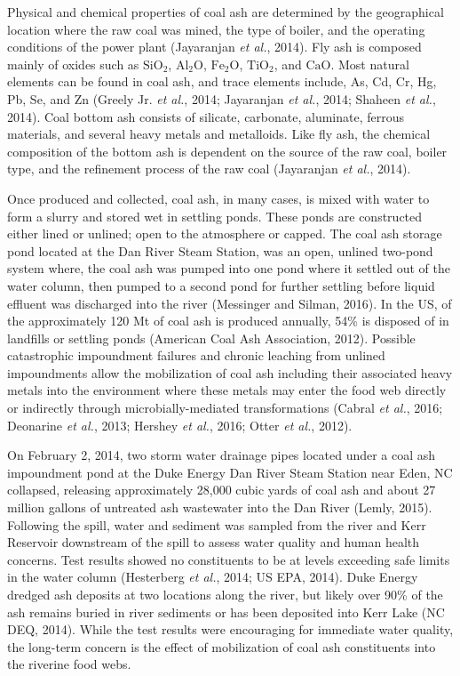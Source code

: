 \documentclass[ms, hidelinks]{uncgdissertationexp3}
\theoremstyle{plain}
\theoremstyle{definition}
\theoremstyle{remark}
\begin{document}
Physical and chemical properties of coal ash are determined by the geographical location where the raw coal was mined, the type of boiler, and the operating conditions of the power plant (Jayaranjan \emph{et al.}, 2014). Fly ash is composed mainly of oxides such as \(\mathrm{SiO_2}\), \(\mathrm{Al_2O}\), \(\mathrm{Fe_2O}\), \(\mathrm{TiO_2}\), and \(\mathrm{CaO}\). Most natural elements can be found in coal ash, and trace elements include, As, Cd, Cr, Hg, Pb, Se, and Zn (Greely Jr. \emph{et al.}, 2014; Jayaranjan \emph{et al.}, 2014; Shaheen \emph{et al.}, 2014). Coal bottom ash consists of silicate, carbonate, aluminate, ferrous materials, and several heavy metals and metalloids. Like fly ash, the chemical composition of the bottom ash is dependent on the source of the raw coal, boiler type, and the refinement process of the raw coal (Jayaranjan \emph{et al.}, 2014).

Once produced and collected, coal ash, in many cases, is mixed with water to form a slurry and stored wet in settling ponds. These ponds are constructed either lined or unlined; open to the atmosphere or capped. The coal ash storage pond located at the Dan River Steam Station, was an open, unlined two-pond system where, the coal ash was pumped into one pond where it settled out of the water column, then pumped to a second pond for further settling before liquid effluent was discharged into the river (Messinger and Silman, 2016). In the US, of the approximately 120 Mt of coal ash is produced annually, 54\% is disposed of in landfills or settling ponds (American Coal Ash Association, 2012). Possible catastrophic impoundment failures and chronic leaching from unlined impoundments allow the mobilization of coal ash including their associated heavy metals into the environment where these metals may enter the food web directly or indirectly through microbially-mediated transformations (Cabral \emph{et al.}, 2016; Deonarine \emph{et al.}, 2013; Hershey \emph{et al.}, 2016; Otter \emph{et al.}, 2012).

On February 2, 2014, two storm water drainage pipes located under a coal ash impoundment pond at the Duke Energy Dan River Steam Station near Eden, NC collapsed, releasing approximately 28,000 cubic yards of coal ash and about 27 million gallons of untreated ash wastewater into the Dan River (Lemly, 2015). Following the spill, water and sediment was sampled from the river and Kerr Reservoir downstream of the spill to assess water quality and human health concerns. Test results showed no constituents to be at levels exceeding safe limits in the water column (Hesterberg \emph{et al.}, 2014; US EPA, 2014). Duke Energy dredged ash deposits at two locations along the river, but likely over 90\% of the ash remains buried in river sediments or has been deposited into Kerr Lake (NC DEQ, 2014). While the test results were encouraging for immediate water quality, the long-term concern is the effect of mobilization of coal ash constituents into the riverine food webs.
\end{document}
